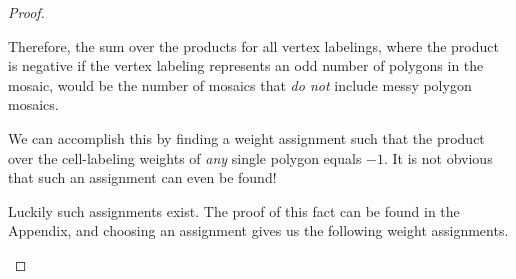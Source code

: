 \documentclass[12pt]{article}
\theoremstyle{plain}
\theoremstyle{definition}
\theoremstyle{remark}
\theoremstyle{definition}
\newcommand{\cell}[4]{ \draw[thick] ( #1 , #2 ) rectangle ( #3 , #4 );}
\newcommand{\cellopen}[4]{ \draw[thick] ( #1 , #2 ) rectangle ( #3 , #4 ); \node[shape=circle,draw=red,fill=red, inner sep=0pt,minimum size=3pt] (A) at ( #1 * 0.5 + #3 * 0.5 , #2 * 0.5 + #4 * 0.5 ){};}
\newcommand{\cellA}[4]{ \draw[thick] ( #1 , #2 ) rectangle ( #3 , #4 ); \draw[red, thick, densely dotted] (#3 * 0.5 + #1 * 0.5 , #2) -- (#3, #4 * 0.5 + #2 * 0.5);}
\newcommand{\cellB}[4]{ \draw[thick] ( #1 , #2 ) rectangle ( #3 , #4 ); \draw[red, thick, densely dotted] (#3 * 0.5 + #1 * 0.5 , #2) -- (#1, #4 * 0.5 + #2 * 0.5);}
\newcommand{\cellC}[4]{ \draw[thick] ( #1 , #2 ) rectangle ( #3 , #4 ); \draw[red, thick, densely dotted] (#3 * 0.5 + #1 * 0.5 , #4) -- (#1, #4 * 0.5 + #2 * 0.5);}
\newcommand{\cellD}[4]{ \draw[thick] ( #1 , #2 ) rectangle ( #3 , #4 ); \draw[red, thick, densely dotted] (#3 * 0.5 + #1 * 0.5 , #4) -- (#3, #4 * 0.5 + #2 * 0.5);}
\newcommand{\lablvertex}[3]{\node[shape=circle,draw=none,fill=white, inner sep=2pt,minimum size=5pt] (A) at ( #1 , #2 ) {#3};}
\begin{document}
\begin{proof}
\begin{center}
\end{center}

Therefore, the sum over the products for all vertex labelings, where the product is negative if the vertex labeling represents an odd number of polygons in the mosaic, would be the number of mosaics that \textit{do not} include messy polygon mosaics.

We can accomplish this by finding a weight assignment such that the product over the cell-labeling weights of \textit{any} single polygon equals $-1$. It is not obvious that such an assignment can even be found! 

Luckily such assignments exist. The proof of this fact can be found in the Appendix, and choosing an assignment gives us the following weight assignments.

\begin{center}
\end{center}
\end{proof}
\end{document}
